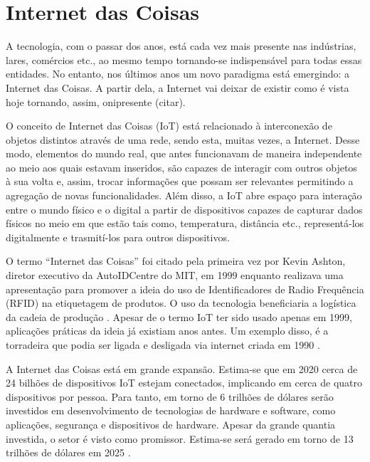 \chapter{Internet das Coisas}
\label{cap:internet_of_things}



A tecnologia, com o passar dos anos, está cada vez mais presente nas indústrias, lares, comércios etc., ao mesmo tempo tornando-se indispensável para todas essas entidades. No entanto, nos últimos anos um novo paradigma está emergindo: a Internet das Coisas. A partir dela, a Internet vai deixar de existir como é vista hoje tornando, assim, onipresente (citar).


O conceito de Internet das Coisas (IoT) está relacionado à interconexão de objetos distintos através de uma rede, sendo esta, muitas vezes, a Internet. Desse modo, elementos do mundo real, que antes funcionavam de maneira independente ao meio aos quais estavam inseridos, são capazes de interagir com outros objetos à sua volta e, assim, trocar informações que possam ser relevantes permitindo a agregação de novas funcionalidades.  Além disso, a IoT abre espaço para interação 
entre o mundo físico e o digital a partir de dispositivos capazes de capturar dados físicos no meio em que estão tais como, temperatura, distância etc., representá-los digitalmente e trasmití-los para outros dispositivos.

	
O termo ``Internet das Coisas'' foi citado pela primeira vez por Kevin Ashton, diretor executivo da AutoIDCentre do MIT, em 1999 enquanto realizava uma apresentação para promover a ideia do uso de Identificadores de Radio Frequência (RFID) na etiquetagem de produtos. O uso da tecnologia beneficiaria a logística da cadeia de produção \cite{Finep2015}. Apesar de o termo IoT ter sido usado apenas em 1999, aplicações práticas da ideia já existiam anos antes. Um exemplo disso, é a torradeira que podia ser ligada e desligada via internet criada em 1990 \cite{Suresh2014}.


A Internet das Coisas está em grande expansão. Estima-se que em 2020 cerca de 24 bilhões de dispositivos IoT estejam conectados, implicando em cerca de quatro dispositivos por pessoa. Para tanto, em torno de 6 trilhões de dólares serão investidos em desenvolvimento de tecnologias de hardware e software, como aplicações, segurança e dispositivos de hardware. Apesar da grande quantia investida, o setor é visto como promissor. Estima-se será gerado em torno de 13 trilhões de dólares em 2025 \cite{Meola2016}.




